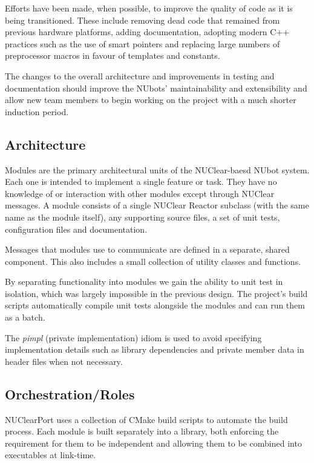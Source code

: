 \documentclass[english,12pt]{scrartcl}
\begin{document}
		Efforts have been made, when possible, to improve the quality of code as it is being
		transitioned. These include removing dead code that remained from previous hardware
		platforms, adding documentation, adopting modern C++ practices such as the use of smart
		pointers and replacing large numbers of preprocessor macros in favour of templates and
		constants.
		
		The changes to the overall architecture and improvements in testing and documentation
		should improve the NUbots' maintainability and extensibility and allow new team members
		to begin working on the project with a much shorter induction period.
		

		\subsection{Architecture}
			Modules are the primary architectural units of the NUClear-baesd NUbot system. Each
			one is intended to implement a single feature or task. They have no knowledge of or
			interaction with other modules except through NUClear messages. A module consists of
			a single NUClear Reactor subclass (with the same name as the module itself), any
			supporting source files, a set of unit tests, configuration files and documentation.
			
			Messages that modules use to communicate are defined in a separate, shared component.
			This also includes a small collection of utility classes and functions.
			
			By separating functionality into modules we gain the ability to unit test in isolation,
			which was largely impossible in the previous design. The project's build scripts
			automatically compile unit tests alongside the modules and can run them as a batch.
			
			The \emph{pimpl} (private implementation) idiom is used to avoid specifying
			implementation details such as library dependencies and private member data in header
			files when not necessary.
			
			
		\subsection{Orchestration/Roles}
			NUClearPort uses a collection of CMake build scripts to automate the build process.
			Each module is built separately into a library, both enforcing the requirement for
			them to be independent and allowing them to be combined into executables at
			link-time.
			
\end{document}
